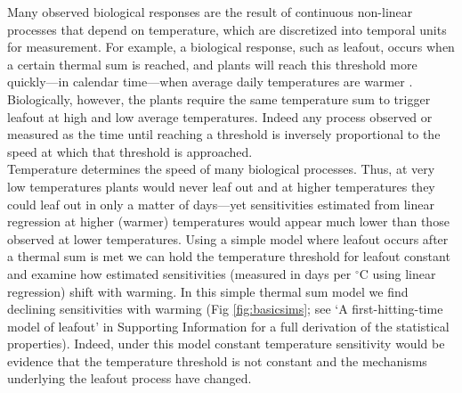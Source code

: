 \documentclass[11pt,letter]{article}
\begin{document}
Many observed biological responses are the result of continuous non-linear processes that depend on temperature, which are discretized into temporal units for measurement. For example, a biological response, such as leafout, occurs when a certain thermal sum is reached, and plants will reach this threshold more quickly---in calendar time---when average daily temperatures are warmer \citep[Fig. \ref{fig:ospreewsims},][]{kramer2012book}. 
Biologically, however, the plants require the same temperature sum to trigger leafout at high and low average temperatures. Indeed any process observed or measured as the time until reaching a threshold is inversely proportional to the speed at which that threshold is approached. \\ %

Temperature determines the speed of many biological processes. Thus, at very low temperatures plants would never leaf out and at higher temperatures they could leaf out in only a matter of days---yet sensitivities estimated from linear regression at higher (warmer) temperatures would appear much lower than those observed at lower temperatures. Using a simple model where leafout occurs after a thermal sum is met we can hold the temperature threshold for leafout constant \citep{zohner2020gcb} and examine how estimated sensitivities (measured in days per $^{\circ}$C using linear regression) shift with warming. In this simple thermal sum model \citep[which we argue is the null model for studies of biological events across different temperatures, Fig. \ref{fig:ospreewsims} and][]{kramer2012book,zohner2020gcb} we find declining sensitivities with warming (Fig \ref{fig:basicsims}; see `A first-hitting-time model of leafout' in Supporting Information for a full derivation of the statistical properties). Indeed, under this model constant temperature sensitivity would be evidence that the temperature threshold is not constant and the mechanisms underlying the leafout process have changed. \\
\end{document}
